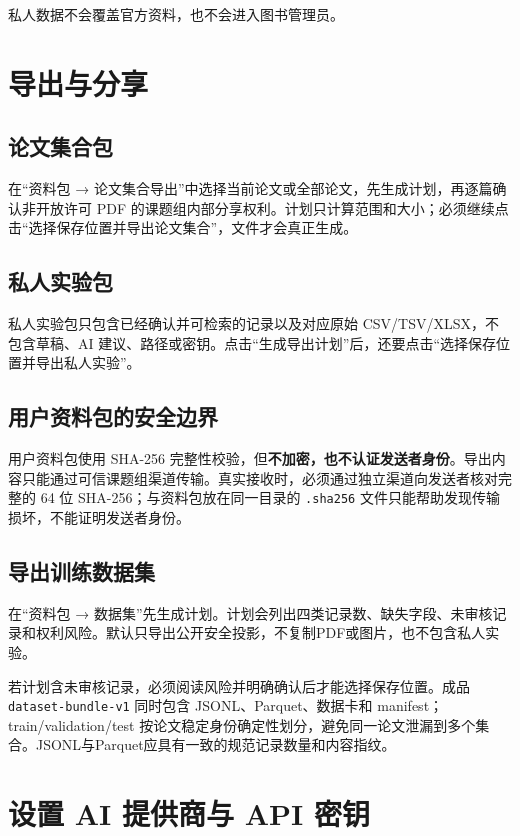 \documentclass[11pt,a4paper]{ctexart}
\begin{document}
私人数据不会覆盖官方资料，也不会进入图书管理员。

\section{导出与分享}

\subsection{论文集合包}

在“资料包 → 论文集合导出”中选择当前论文或全部论文，先生成计划，再逐篇确认非开放许可 PDF 的课题组内部分享权利。计划只计算范围和大小；必须继续点击“选择保存位置并导出论文集合”，文件才会真正生成。

\subsection{私人实验包}

私人实验包只包含已经确认并可检索的记录以及对应原始 CSV/TSV/XLSX，不包含草稿、AI 建议、路径或密钥。点击“生成导出计划”后，还要点击“选择保存位置并导出私人实验”。

\subsection{用户资料包的安全边界}

用户资料包使用 SHA-256 完整性校验，但\textbf{不加密，也不认证发送者身份}。导出内容只能通过可信课题组渠道传输。真实接收时，必须通过独立渠道向发送者核对完整的 64 位 SHA-256；与资料包放在同一目录的 \texttt{.sha256} 文件只能帮助发现传输损坏，不能证明发送者身份。

\subsection{导出训练数据集}

在“资料包 → 数据集”先生成计划。计划会列出四类记录数、缺失字段、未审核记录和权利风险。默认只导出公开安全投影，不复制PDF或图片，也不包含私人实验。

若计划含未审核记录，必须阅读风险并明确确认后才能选择保存位置。成品 \texttt{dataset-bundle-v1} 同时包含 JSONL、Parquet、数据卡和 manifest；train/validation/test 按论文稳定身份确定性划分，避免同一论文泄漏到多个集合。JSONL与Parquet应具有一致的规范记录数量和内容指纹。

\section{设置 AI 提供商与 API 密钥}
\end{document}
